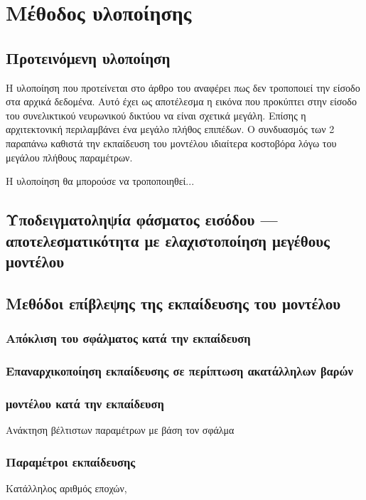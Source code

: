 \chapter{Μέθοδος υλοποίησης}
\label{ch:implementation_method}

\section{Προτεινόμενη υλοποίηση}
Η υλοποίηση που προτείνεται στο άρθρο του  αναφέρει πως δεν τροποποιεί την είσοδο στα αρχικά δεδομένα. Αυτό έχει ως αποτέλεσμα η εικόνα που προκύπτει στην είσοδο του συνελικτικού νευρωνικού δικτύου να είναι σχετικά μεγάλη. Επίσης η αρχιτεκτονική περιλαμβάνει ένα μεγάλο πλήθος επιπέδων. Ο συνδυασμός των 2 παραπάνω καθιστά την εκπαίδευση του μοντέλου ιδιαίτερα κοστοβόρα λόγω του μεγάλου πλήθους παραμέτρων.

Η υλοποίηση θα μπορούσε να τροποποιηθεί...

\section{Υποδειγματοληψία φάσματος εισόδου --- αποτελεσματικότητα με ελαχιστοποίηση μεγέθους μοντέλου}

\section{Μεθόδοι επίβλεψης της εκπαίδευσης του μοντέλου}

\subsection{Απόκλιση του σφάλματος  κατά την εκπαίδευση}

\subsection{Επαναρχικοποίηση εκπαίδευσης σε περίπτωση ακατάλληλων βαρών}

\subsection{ μοντέλου κατά την εκπαίδευση}
Ανάκτηση βέλτιστων παραμέτρων με βάση τον σφάλμα 

\subsection{Παραμέτροι εκπαίδευσης}
Κατάλληλος αριθμός εποχών, 

